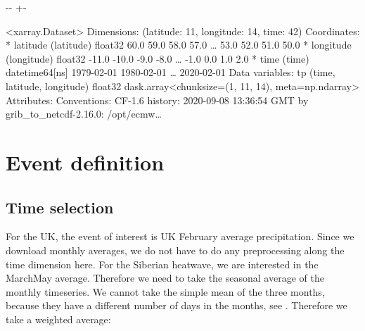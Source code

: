 \documentclass[letterpaper,10pt,english]{sphinxmanual}
\newlength\nbsphinxcodecellspacing
\begin{document}
{

\kern-\sphinxverbatimsmallskipamount\kern-\baselineskip
\kern+\FrameHeightAdjust\kern-\fboxrule
\vspace{\nbsphinxcodecellspacing}

\begin{sphinxVerbatim}[commandchars=\\\{\}]
\llap{\color{nbsphinxout}[13]:\,\hspace{\fboxrule}\hspace{\fboxsep}}<xarray.Dataset>
Dimensions:    (latitude: 11, longitude: 14, time: 42)
Coordinates:
  * latitude   (latitude) float32 60.0 59.0 58.0 57.0 {\ldots} 53.0 52.0 51.0 50.0
  * longitude  (longitude) float32 -11.0 -10.0 -9.0 -8.0 {\ldots} -1.0 0.0 1.0 2.0
  * time       (time) datetime64[ns] 1979-02-01 1980-02-01 {\ldots} 2020-02-01
Data variables:
    tp         (time, latitude, longitude) float32 dask.array<chunksize=(1, 11, 14), meta=np.ndarray>
Attributes:
    Conventions:  CF-1.6
    history:      2020-09-08 13:36:54 GMT by grib\_to\_netcdf-2.16.0: /opt/ecmw{\ldots}
\end{sphinxVerbatim}
}


\section{Event definition}
\label{\detokenize{Notebooks/2.Preprocess/2.Preprocess:Event-definition}}

\subsection{Time selection}
\label{\detokenize{Notebooks/2.Preprocess/2.Preprocess:Time-selection}}
For the UK, the event of interest is UK February average precipitation. Since we download monthly averages, we do not have to do any preprocessing along the time dimension here. For the Siberian heatwave, we are interested in the March\sphinxhyphen{}May average. Therefore we need to take the seasonal average of the monthly timeseries. We cannot take the simple mean of the three months, because they have a different number of days in the months, see . Therefore we take a weighted average:

{
\begin{sphinxVerbatim}[commandchars=\\\{\}]
\llap{\color{nbsphinxin}[14]:\,\hspace{\fboxrule}\hspace{\fboxsep}}  
\end{sphinxVerbatim}
}
\end{document}
